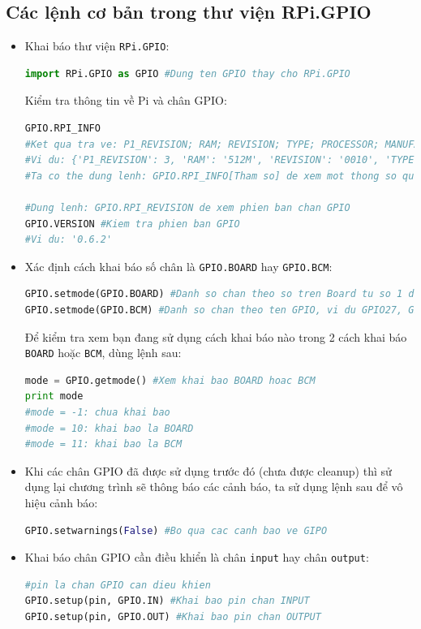 \subsection{Các lệnh cơ bản trong thư viện RPi.GPIO}
%
\begin{itemize}
\item Khai báo thư viện \verb|RPi.GPIO|:
\begin{lstlisting}[language=Python]
import RPi.GPIO as GPIO #Dung ten GPIO thay cho RPi.GPIO
\end{lstlisting}
Kiểm tra thông tin về Pi và chân GPIO:
\begin{lstlisting}[language=Python]
GPIO.RPI_INFO
#Ket qua tra ve: P1_REVISION; RAM; REVISION; TYPE; PROCESSOR; MANUFACTURER
#Vi du: {'P1_REVISION': 3, 'RAM': '512M', 'REVISION': '0010', 'TYPE': 'Model B+', 'PROCESSOR': 'BCM2835', 'MANUFACTURER': 'Unknown'}
#Ta co the dung lenh: GPIO.RPI_INFO[Tham so] de xem mot thong so quan tam

#Dung lenh: GPIO.RPI_REVISION de xem phien ban chan GPIO 
GPIO.VERSION #Kiem tra phien ban GPIO
#Vi du: '0.6.2'
\end{lstlisting}
\item Xác định cách khai báo số chân là \verb|GPIO.BOARD| hay \verb|GPIO.BCM|:
\begin{lstlisting}[language=Python]
GPIO.setmode(GPIO.BOARD) #Danh so chan theo so tren Board tu so 1 den so 40
GPIO.setmode(GPIO.BCM) #Danh so chan theo ten GPIO, vi du GPIO27, GIPO14,...
\end{lstlisting}
Để kiểm tra xem bạn đang sử dụng cách khai báo nào trong 2 cách khai báo \verb|BOARD| hoặc \verb|BCM|, dùng lệnh sau:
\begin{lstlisting}[language=Python]
mode = GPIO.getmode() #Xem khai bao BOARD hoac BCM
print mode  
#mode = -1: chua khai bao
#mode = 10: khai bao la BOARD
#mode = 11: khai bao la BCM
\end{lstlisting}
\item Khi các chân GPIO đã được sử dụng trước đó (chưa được cleanup) thì sử dụng lại chương trình sẽ thông báo các cảnh báo, ta sử dụng lệnh sau để vô hiệu cảnh báo:
\begin{lstlisting}[language=Python]
GPIO.setwarnings(False) #Bo qua cac canh bao ve GIPO
\end{lstlisting}
\item Khai báo chân GPIO cần điều khiển là chân \verb|input| hay chân \verb|output|:
\begin{lstlisting}[language=Python]
#pin la chan GPIO can dieu khien
GPIO.setup(pin, GPIO.IN) #Khai bao pin chan INPUT
GPIO.setup(pin, GPIO.OUT) #Khai bao pin chan OUTPUT



\end{lstlisting}
\end{itemize}

